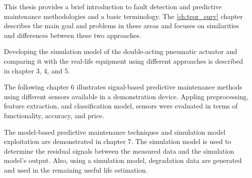 This thesis provides a brief introduction to fault detection and predictive
maintenance methodologies and a basic terminology. 
The \ref{ch:teor_surv} chapter describes the main goal and problems
in these areas and focuses on similarities and differences between these
two approaches.

Developing the simulation model of the double-acting pneumatic actuator and
comparing it with the real-life equipment using different approaches is
described in chapter 3, 4, and 5. 

The following chapter 6 illustrates signal-based predictive maintenance
methods using different sensors available in a demonstration device.
Appling preprocessing, feature extraction, and classification model,
sensors were evaluated in terms of functionality, accuracy, and price. 

The model-based predictive maintenance techniques and simulation model
exploitation are demonstrated in chapter 7. The simulation model is used to
determine the residual signals between the measured data and the simulation
model's output. Also, using a simulation model, degradation data are
generated and used in the remaining useful life estimation.

